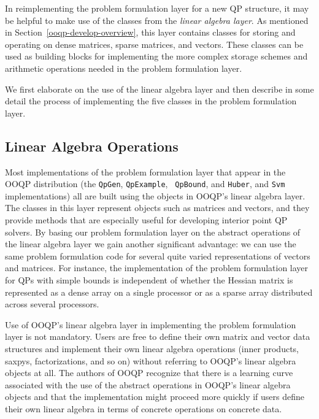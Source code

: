 In reimplementing the problem formulation layer for a new QP
structure, it may be helpful to make use of the classes from the {\em
linear algebra layer}. As mentioned in
Section~\ref{ooqp-develop-overview}, this layer contains classes for
storing and operating on dense matrices, sparse matrices, and
vectors. These classes can be used as building blocks for implementing
the more complex storage schemes and arithmetic operations needed in
the problem formulation layer.

We first elaborate on the use of the linear algebra layer and then
describe in some detail the process of implementing the five classes
in the problem formulation layer.

\subsection{Linear Algebra Operations}

Most implementations of the problem formulation layer that appear in
the OOQP distribution (the {\tt QpGen}, {\tt QpExample}, {\tt
QpBound}, and {\tt Huber}, and {\tt Svm} implementations) all are
built using the objects in OOQP's linear algebra layer. The classes in
this layer represent objects such as matrices and vectors, and they
provide methods that are especially useful for developing interior
point QP solvers.  By basing our problem formulation layer on the
abstract operations of the linear algebra layer we gain another
significant advantage: we can use the same problem formulation code
for several quite varied representations of vectors and matrices.  For
instance, the implementation of the problem formulation layer for QPs
with simple bounds is independent of whether the Hessian matrix is
represented as a dense array on a single processor or as a sparse
array distributed across several processors.

Use of OOQP's linear algebra layer in implementing the problem
formulation layer is not mandatory.  Users are free to define their
own matrix and vector data structures and implement their own linear
algebra operations (inner products, saxpys, factorizations, and so on)
without referring to OOQP's linear algebra objects at all.  The
authors of OOQP recognize that there is a learning curve associated
with the use of the abstract operations in OOQP's linear algebra
objects and that the implementation might proceed more quickly if
users define their own linear algebra in terms of concrete operations
on concrete data.

